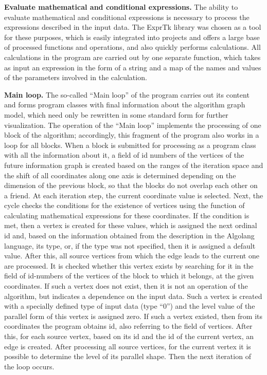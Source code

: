 \textbf{Evaluate mathematical and conditional expressions.} The ability to evaluate mathematical and conditional expressions is necessary to process the expressions described in the input data. The ExprTk library was chosen as a tool for these purposes, which is easily integrated into projects and offers a large base of processed functions and operations, and also quickly performs calculations. All calculations in the program are carried out by one separate function, which takes as input an expression in the form of a string and a map of the names and values of the parameters involved in the calculation.

\textbf{Main loop.} The so-called ``Main loop'' of the program carries out its content and forms program classes with final information about the algorithm graph model, which need only be rewritten in some standard form for further visualization. The operation of the “Main loop” implements the processing of one block of the algorithm; accordingly, this fragment of the program also works in a loop for all blocks. When a block is submitted for processing as a program class with all the information about it, a field of id numbers of the vertices of the future information graph is created based on the ranges of the iteration space and the shift of all coordinates along one axis is determined depending on the dimension of the previous block, so that the blocks do not overlap each other on a friend. At each iteration step, the current coordinate value is selected. Next, the cycle checks the conditions for the existence of vertices using the function of calculating mathematical expressions for these coordinates. If the condition is met, then a vertex is created for these values, which is assigned the next ordinal id and, based on the information obtained from the description in the Algolang language, its type, or, if the type was not specified, then it is assigned a default value. After this, all source vertices from which the edge leads to the current one are processed. It is checked whether this vertex exists by searching for it in the field of id-numbers of the vertices of the block to which it belongs, at the given coordinates. If such a vertex does not exist, then it is not an operation of the algorithm, but indicates a dependence on the input data. Such a vertex is created with a specially defined type of input data (type ``0'') and the level value of the parallel form of this vertex is assigned zero. If such a vertex existed, then from its coordinates the program obtains id, also referring to the field of vertices. After this, for each source vertex, based on its id and the id of the current vertex, an edge is created. After processing all source vertices, for the current vertex it is possible to determine the level of its parallel shape. Then the next iteration of the loop occurs.

